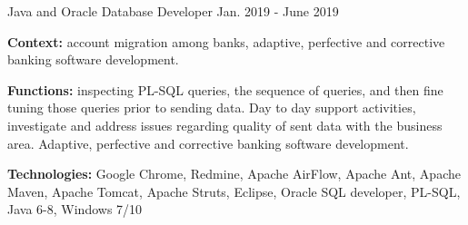 \begin{cventries}
  \cventry
    {Java and Oracle Database Developer} %
    {} %
    {} %
    {Jan. 2019 - June 2019} %
    {
      \begin{cvitems} %
		\item[] {\textbf{Context:} account migration among banks, adaptive, perfective and corrective banking software development. 
}
		\item[] {\textbf{Functions:} inspecting PL-SQL queries, the sequence of queries, and then fine tuning those queries prior to sending data. Day to day support activities, investigate and address issues regarding quality of sent data with the business area. Adaptive, perfective and corrective banking software development.}		
		\item[] {\textbf{Technologies:} 
		\textcolor{rainbowcolor-olive}{Google Chrome}, 
		\textcolor{rainbowcolor-olive}{Redmine}, 
		\textcolor{rainbowcolor-olive}{Apache AirFlow}, 
		\textcolor{rainbowcolor-olive}{Apache Ant}, 
		\textcolor{rainbowcolor-olive}{Apache Maven}, 
		\textcolor{rainbowcolor-olive}{Apache Tomcat}, 
		\textcolor{rainbowcolor-olive}{Apache Struts}, 
		\textcolor{rainbowcolor-olive}{Eclipse}, 
		\textcolor{rainbowcolor-olive}{Oracle SQL developer},
		\textcolor{rainbowcolor-indigo}{PL-SQL}, 
		\textcolor{rainbowcolor-indigo}{Java 6-8}, 
		\textcolor{rainbowcolor-orange}{Windows 7/10}}		
      \end{cvitems}
    } 
    

\end{cventries}
